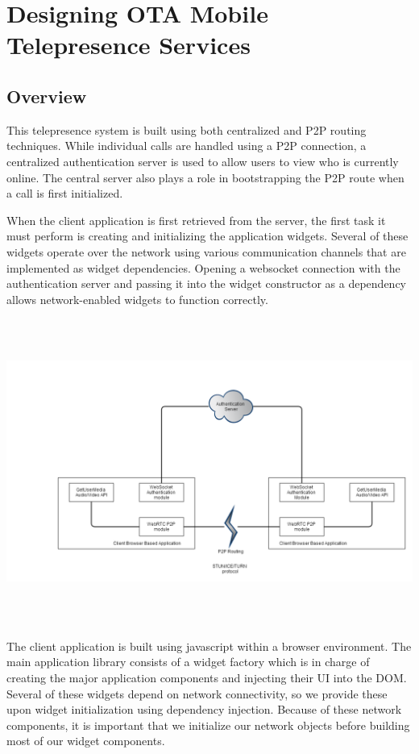 \documentclass[a4paper,12pt]{report}
\begin{document}
\chapter{Designing OTA Mobile Telepresence Services}
\section{Overview}
This telepresence system is built using both centralized and P2P routing techniques. While individual calls are handled using a P2P connection, a centralized authentication server is used to allow users to view who is currently online. The central server also plays a role in bootstrapping the P2P route when a call is first initialized.

When the client application is first retrieved from the server, the first task it must perform is creating and initializing the application widgets. Several of these widgets operate over the network using various communication channels that are implemented as widget dependencies. Opening a websocket connection with the authentication server and passing it into the widget constructor as a dependency allows network-enabled widgets to function correctly. 

\includegraphics[width=16cm,height=10cm]{NetworkModules}

The client application is built using javascript within a browser environment. The main application library consists of a widget factory which is in charge of creating the major application components and injecting their UI into the DOM. Several of these widgets depend on network connectivity, so we provide these upon widget initialization using dependency injection. Because of these network components, it is important that we initialize our network objects before building most of our widget components.
\end{document}
